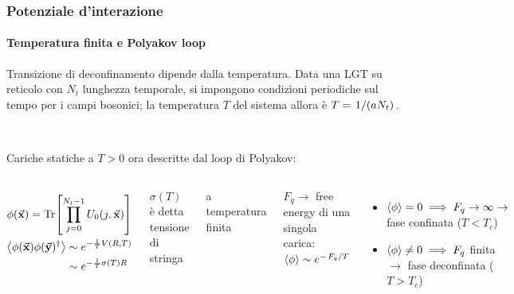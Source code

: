 \documentclass{beamer}
\begin{document}
\begin{frame}
	\frametitle{Potenziale d'interazione}
	\framesubtitle{Temperatura finita e Polyakov loop}

	Transizione di deconfinamento dipende dalla temperatura. Data una LGT su reticolo con $N_t$ lunghezza temporale,
	si impongono \alert{condizioni periodiche sul tempo} per i campi bosonici; 
	la temperatura $T$ del sistema allora è $T = \flatfrac{1}{(aN_t)}$.

	\

	Cariche statiche a $T > 0$ ora descritte dal \alert{loop di Polyakov}:

	\begin{columns}
			\begin{equation*}
				\begin{gathered}
					\phi(\va{x}) = \Tr[\prod_{j = 0}^{N_t - 1} U_0(j, \va{x})] \\
					\begin{aligned}
						\expval{\phi(\va{x}) \phi(\va{y})^\dagger} &\sim e^{-\frac{1}{T} V(R, T)} \\
						&\sim e^{-\frac{1}{T}\sigma(T) R}						
					\end{aligned}
				\end{gathered}
			\end{equation*}

			$\sigma(T)$ è detta \alert{tensione di stringa}
			
			\alert{a temperatura finita}

			$F_q \rightarrow$ free energy di una singola carica: $\expval{\phi} \sim e^{-\flatfrac{F_q}{T}}$

			\begin{itemize}
				\item $\expval{\phi} = 0 \implies F_q \rightarrow \infty \rightarrow$ fase confinata ($T < T_c$)
				\item $\expval{\phi} \neq 0 \implies F_q$ finita $\rightarrow$ fase deconfinata ($T > T_c$)
			\end{itemize}
	\end{columns}

\end{frame}
\end{document}
